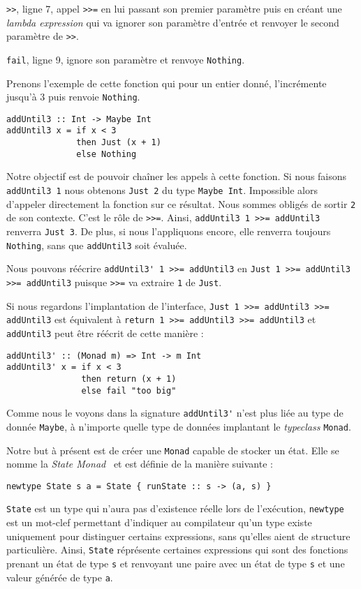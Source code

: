 \documentclass{llncs}
\begin{document}
\lstinline{>>}, ligne 7, appel \lstinline{>>=} en lui passant son premier paramètre
puis en créant une \emph{lambda expression} qui va ignorer son paramètre d'entrée
et renvoyer le second paramètre de \lstinline{>>}.

\lstinline{fail}, ligne 9, ignore son paramètre et renvoye \lstinline{Nothing}.

Prenons l'exemple de cette fonction qui pour un entier donné, l'incrémente jusqu'à
3 puis renvoie \lstinline{Nothing}.
\begin{lstlisting}
addUntil3 :: Int -> Maybe Int
addUntil3 x = if x < 3
              then Just (x + 1)
              else Nothing
\end{lstlisting}

Notre objectif est de pouvoir chaîner les appels à cette fonction.
Si nous faisons \lstinline{addUntil3 1} nous obtenons \lstinline{Just 2} du type \lstinline{Maybe Int}.
Impossible alors d'appeler directement la fonction sur ce résultat.
Nous sommes obligés de sortir \lstinline{2} de son contexte.
C'est le rôle de \lstinline{>>=}.
Ainsi, \lstinline{addUntil3 1 >>= addUntil3} renverra \lstinline{Just 3}.
De plus, si nous l'appliquons encore, elle renverra toujours \lstinline{Nothing},
sans que \lstinline{addUntil3} soit évaluée.

Nous pouvons réécrire \lstinline{addUntil3' 1 >>= addUntil3} en \lstinline{Just 1 >>= addUntil3 >>= addUntil3}
puisque \lstinline{>>=} va extraire \lstinline{1} de \lstinline{Just}.

Si nous regardons l'implantation de l'interface, \lstinline{Just 1 >>= addUntil3 >>= addUntil3}
est équivalent à \lstinline{return 1 >>= addUntil3 >>= addUntil3} et \lstinline{addUntil3}
peut être réécrit de cette manière :
\begin{lstlisting}
addUntil3' :: (Monad m) => Int -> m Int
addUntil3' x = if x < 3
               then return (x + 1)
               else fail "too big"
\end{lstlisting}

Comme nous le voyons dans la signature \lstinline{addUntil3'} n'est plus liée au type
de donnée \lstinline{Maybe}, à n'importe quelle type de données implantant le \emph{typeclass}
\lstinline{Monad}.

Notre but à présent est de créer une \lstinline{Monad} capable de stocker un état.
Elle se nomme la \emph{State Monad}~\cite{PeytonJones95} et est définie de la manière
suivante :
\begin{lstlisting}
newtype State s a = State { runState :: s -> (a, s) }
\end{lstlisting}
\lstinline{State} est un type qui n'aura pas d'existence réelle lors de l'exécution,
\lstinline{newtype} est un mot-clef permettant d'indiquer au compilateur qu'un type
existe uniquement pour distinguer certains expressions, sans qu'elles aient de
structure particulière.
Ainsi, \lstinline{State} réprésente certaines expressions qui sont des fonctions
prenant un état de type \lstinline{s} et renvoyant une paire avec un état
de type \lstinline{s} et une valeur générée de type \lstinline{a}.
\end{document}
